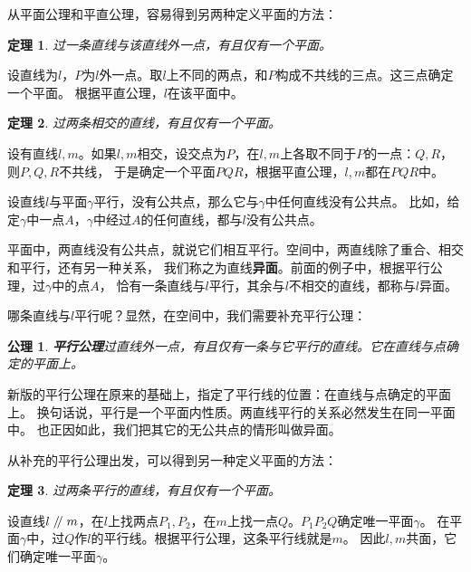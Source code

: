 \documentclass[12pt,UTF8]{ctexbook}
\newtheorem{tm}{定理}[section]
\newtheorem{po}{公理}
\renewcommand\parallel{\mathrel{/\mskip-4mu/}}
\begin{document}

从平面公理和平直公理，容易得到另两种定义平面的方法：
\begin{tm}\label{tm:1-0-0}
    过一条直线与该直线外一点，有且仅有一个平面。
\end{tm}
\begin{proof2}
    设直线为$l$，$P$为$l$外一点。取$l$上不同的两点，和$P$构成不共线的三点。这三点确定一个平面。
    根据平直公理，$l$在该平面中。
\end{proof2}
\begin{tm}\label{tm:1-0-1}
    过两条相交的直线，有且仅有一个平面。
\end{tm}
\begin{proof2}
    设有直线$l,m$。如果$l,m$相交，设交点为$P$，在$l,m$上各取不同于$P$的一点：$Q,R$，则$P,Q,R$不共线，
    于是确定一个平面$PQR$，根据平直公理，$l,m$都在$PQR$中。
\end{proof2}

设直线$l$与平面$\gamma$平行，没有公共点，那么它与$\gamma$中任何直线没有公共点。
比如，给定$\gamma$中一点$A$，$\gamma$中经过$A$的任何直线，都与$l$没有公共点。

平面中，两直线没有公共点，就说它们相互平行。空间中，两直线除了重合、相交和平行，还有另一种关系，
我们称之为直线\textbf{异面}。前面的例子中，根据平行公理，过$\gamma$中的点$A$，
恰有一条直线与$l$平行，其余与$l$不相交的直线，都称与$l$异面。

哪条直线与$l$平行呢？显然，在空间中，我们需要补充平行公理：
\begin{po}{\textbf{平行公理}}\label{po:2}
    过直线外一点，有且仅有一条与它平行的直线。它在直线与点确定的平面上。
\end{po}
新版的平行公理在原来的基础上，指定了平行线的位置：在直线与点确定的平面上。
换句话说，平行是一个平面内性质。两直线平行的关系必然发生在同一平面中。
也正因如此，我们把其它的无公共点的情形叫做异面。

从补充的平行公理出发，可以得到另一种定义平面的方法：
\begin{tm}\label{tm:1-0-2}
    过两条平行的直线，有且仅有一个平面。
\end{tm}
\begin{proof2}
    设直线$l \parallel m$，在$l$上找两点$P_1,P_2$，在$m$上找一点$Q$。$P_1P_2Q$确定唯一平面$\gamma$。
    在平面$\gamma$中，过$Q$作$l$的平行线。根据平行公理，这条平行线就是$m$。
    因此$l,m$共面，它们确定唯一平面$\gamma$。
\end{proof2}
\end{document}
